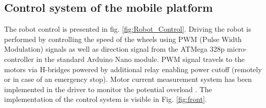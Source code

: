\documentclass[3p,times,12pt]{elsarticle}
\begin{document}
\subsection{Control system of the mobile platform}
The robot control is presented in fig. \ref{fig:Robot_Control}. Driving the robot is performed by controlling the speed of the wheels using PWM (Pulse Width Modulation) signals as well as direction signal from the ATMega 328p micro-controller in the standard Arduino Nano module. PWM signal travels to the motors via H-bridges powered by additional relay enabling power cutoff (remotely or in case of an emergency stop). Motor current measurement system has been implemented in the driver to monitor the potential overload \cite{RobotRex}. The implementation of the control system is visible in Fig.  \ref{fig:front}. 
\begin{figure}[ht!]



\end{figure}
\end{document}
